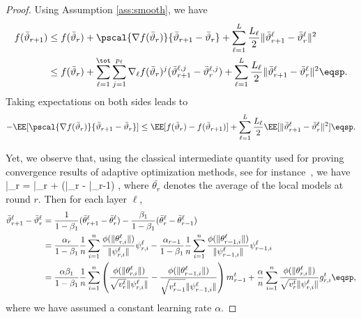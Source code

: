 \documentclass[nohyperref]{article}
\theoremstyle{plain}
\theoremstyle{definition}
\theoremstyle{remark}
\begin{document}
\begin{proof}
Using Assumption \ref{ass:smooth}, we have
\begin{align}\notag
f(\bar{\vartheta}_{r+1}) &  \leq f(\bar{\vartheta}_r) + \pscal{\nabla f(\bar{\vartheta}_r)}{\bar{\vartheta}_{r+1} - \bar{\vartheta}_r} + \sum_{\ell =1}^L \frac{L_\ell}{2} \| \bar{\vartheta}^\ell_{r+1} - \bar{\vartheta}^\ell_r \|^2\\\notag
&  \leq f(\bar{\vartheta}_r) + \sum_{\ell=1}^\tot \sum_{j=1}^{p_\ell} \nabla_{\ell} f(\bar{\vartheta}_r)^j (\bar{\vartheta}^{\ell,j}_{r+1} - \bar{\vartheta}^{\ell,j}_r) + \sum_{\ell =1}^L \frac{L_\ell}{2} \| \bar{\vartheta}^\ell_{r+1} - \bar{\vartheta}^\ell_r \|^2  \eqsp.
\end{align}
Taking expectations on both sides leads to
\begin{align}\label{eq:main}
- \EE[  \pscal{\nabla f(\bar{\vartheta}_r)}{\bar{\vartheta}_{r+1} - \bar{\vartheta}_r}]  \leq  \EE[ f(\bar{\vartheta}_r) - f(\bar{\vartheta}_{r+1})] + \sum_{\ell =1}^L \frac{L_\ell}{2} \EE[  \| \bar{\vartheta}^\ell_{r+1} - \bar{\vartheta}^\ell_r \|^2] \eqsp.
\end{align}

Yet, we observe that, using the classical intermediate quantity used for proving convergence results of adaptive optimization methods, see for instance~\citet{reddi2019convergence}, we have
\beq\label{eq:defseq}
\bar{\vartheta}_r = \bar{\theta}_r +  (\bar{\theta}_{r} - \bar{\theta}_{r-1}) \eqsp,
\eeq
where $\bar{\theta_r}$ denotes the average of the local models at round $r$.
Then for each layer $\ell$,
\begin{align}\label{eq:gap}
\bar{\vartheta}^\ell_{r+1} - \bar{\vartheta}^\ell_r  & = \frac{1}{1-\beta_1}(\bar{\theta}^\ell_{r+1} - \bar{\theta}^\ell_{r}) - \frac{\beta_1}{1-\beta_1}(\bar{\theta}^\ell_{r} - \bar{\theta}^\ell_{r-1}) \nonumber\\
& = \frac{\alpha_{r}}{1-\beta_1} \frac{1}{n} \sum_{i = 1}^n \frac{\phi(\|\theta_{r,i}^{\ell}\|)}{\|\psi_{r,i}^{\ell}\|} \psi_{r,i}^{\ell}  - \frac{\alpha_{r-1}}{1-\beta_1} \frac{1}{n} \sum_{i = 1}^n \frac{\phi(\|\theta_{r-1,i}^{\ell}\|)}{\|\psi_{r-1,i}^{\ell}\|} \psi_{r-1,i}^{\ell}\nonumber\\
& = \frac{\alpha \beta_1}{1-\beta_1} \frac{1}{n}  \sum_{i = 1}^n  \left( \frac{\phi(\|\theta_{r,i}^{\ell}\|)}{\sqrt{v^{t}_{r}} \|\psi_{r,i}^{\ell}\|} - \frac{\phi(\|\theta_{r-1,i}^{\ell}\|)}{\sqrt{v^{t}_{r-1}} \|\psi_{r-1,i}^{\ell}\|} \right) m^{t}_{r-1} + \frac{\alpha}{n} \sum_{i = 1}^n \frac{\phi(\|\theta_{r,i}^{\ell}\|)}{\sqrt{v^{t}_{r}} \|\psi_{r,i}^{\ell}\|} g^t_{r,i} \eqsp,
\end{align}
where we have assumed a constant learning rate $\alpha$.



\end{proof}
\end{document}
